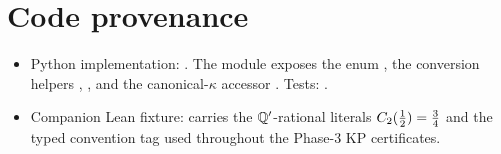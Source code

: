 \section{Code provenance}
\label{sec:heat-kernel-codeanchor}

\begin{itemize}
  \item Python implementation: .
    The module exposes the enum
    ,
    the conversion helpers ,
    , and the canonical-$\kappa$
    accessor .
    Tests: .
  \item Companion Lean fixture: 
    carries the $\mathbb{Q}'$-rational literals $C_2(\tfrac12) =
    \tfrac34$ and the typed convention tag used throughout the
    Phase-3 KP certificates.
\end{itemize}
